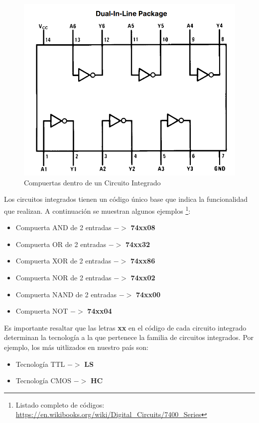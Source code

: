\begin{figure}[H]
    \centering
    \includegraphics[scale=0.3]{images/7404.PNG}
    \caption{Compuertas dentro de un Circuito Integrado}
    \label{Fig:CompuertasEnCI}
\end{figure}

Los circuitos integrados tienen un código único base que indica la funcionalidad que realizan. A continuación se muestran algunos ejemplos
\footnote{Listado completo de códigos:
\url{https://en.wikibooks.org/wiki/Digital_Circuits/7400_Series}}:

\begin{itemize}
    \item Compuerta AND de 2 entradas $->$ \textbf{74xx08}
    \item Compuerta OR de 2 entradas $->$ \textbf{74xx32}
    \item Compuerta XOR de 2 entradas $->$ \textbf{74xx86}
    \item Compuerta NOR de 2 entradas $->$ \textbf{74xx02}
    \item Compuerta NAND de 2 entradas $->$ \textbf{74xx00}
    \item Compuerta NOT $->$ \textbf{74xx04}
\end{itemize}

Es importante resaltar que las letras \textbf{xx} en el código de cada circuito integrado determinan la tecnología a la que pertenece
la familia de circuitos integrados. Por ejemplo, los más uitlizados en nuestro país son:
\begin{itemize}
    \item Tecnología TTL  $->$ \textbf{LS}
    \item Tecnología CMOS $->$ \textbf{HC}
\end{itemize}

